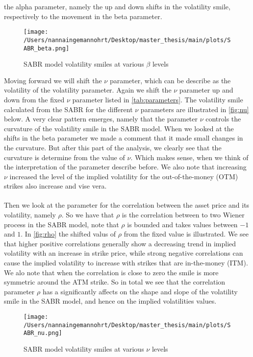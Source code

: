 the alpha parameter, namely the up and down shifts in the volatility smile, respectively to the movement in the 
beta parameter.
\begin{figure}[H]
    \centering
    \texttt{[image: /Users/nannaingemannohrt/Desktop/master\_thesis/main/plots/SABR\_beta.png]}
    \caption{SABR model volatility smiles at various $\beta$ levels}
    \label{fig:beta}
\end{figure}
\noindent
Moving forward we will shift the $\nu$ parameter, which can be describe as the volatility of the volatility parameter.
Again we shift the $\nu$ parameter up and down from the fixed $\nu$ parameter listed in \autoref{tab:parameters}.
The volatility smile calculated from the SABR for the different $\nu$ parameters are illustrated in \autoref{fig:nu} below.
A very clear pattern emerges, namely that the parameter $\nu$ controls the curvature of the volatility smile in
the SABR model. When we looked at the shifts in the beta parameter we made a comment that it made small changes in 
the curvature. But after this part of the analysis, we clearly see that the curvature is determine from the value
of $\nu$. Which makes sense, when we think of the interpretation of the parameter describe before.
We also note that increasing $\nu$  increased the level of the implied volatility for the 
out-of-the-money (OTM) strikes also increase and vise vera.
\\\\
Then we look at the parameter for the correlation between the asset price and its volatility, namely $\rho$.
So we have that $\rho$ is the correlation between to two Wiener process in the SABR model, note
that $\rho$ is bounded and takes values between $-1$ and $1$. In \autoref{fig:rho} the shifted valus of $\rho$
from the fixed value is illustrated. 
We see that higher positive correlations generally show a decreasing trend in implied volatility with an increase in strike price, 
while strong negative correlations can cause the implied volatility to increase with strikes that are in-the-money (ITM).
We alo note that when the correlation is close to zero the smile is more symmetric around the ATM strike. 
So in total we see that the correlation parameter $\rho$ has a significantly affects on the shape and slope of
the volatility smile in the SABR model, and hence on the implied volatilities values.
\begin{figure}[H]
    \centering
    \texttt{[image: /Users/nannaingemannohrt/Desktop/master\_thesis/main/plots/SABR\_nu.png]}
    \caption{SABR model volatility smiles at various $\nu$ levels}
    \label{fig:nu}
\end{figure}


